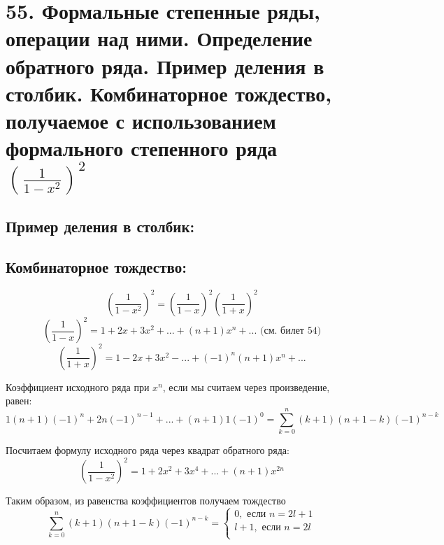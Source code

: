 \section*{55. Формальные степенные ряды, операции над ними. Определение обратного ряда. Пример деления в столбик. Комбинаторное тождество, получаемое с использованием формального степенного ряда $(\frac{1}{1-x^2})^2$}
\subsection*{Пример деления в столбик:}
\begin{figure}[h]
\end{figure}
\par
\subsection*{Комбинаторное тождество:} 
$$\left(\frac{1}{1-x^2}\right)^2=\left(\frac{1}{1-x}\right)^2\left(\frac{1}{1+x}\right)^2$$
$$\left(\frac{1}{1-x}\right)^2=1+2x+3x^2+...+(n+1)x^n+... \mbox{ (см. билет 54)}$$
$$\left(\frac{1}{1+x}\right)^2=1-2x+3x^2-...+(-1)^n(n+1)x^n+...$$
\par Коэффициент исходного ряда при $x^n$, если мы считаем через произведение, равен:
$$1(n+1)(-1)^n+2n(-1)^{n-1}+...+(n+1)1(-1)^0=\sum_{k=0}^n (k+1)(n+1-k)(-1)^{n-k}$$
\par Посчитаем формулу исходного ряда через квадрат обратного ряда:
$$\left(\frac{1}{1-x^2}\right)^2=1+2x^2+3x^4+...+(n+1)x^{2n}$$
\par Таким образом, из равенства коэффициентов получаем тождество
$$\sum_{k=0}^n (k+1)(n+1-k)(-1)^{n-k} = \left\{
\begin{array}{ccc}
0, \mbox{ если } n=2l+1\\
l+1, \mbox{ если } n=2l\\
\end{array}
\right. $$